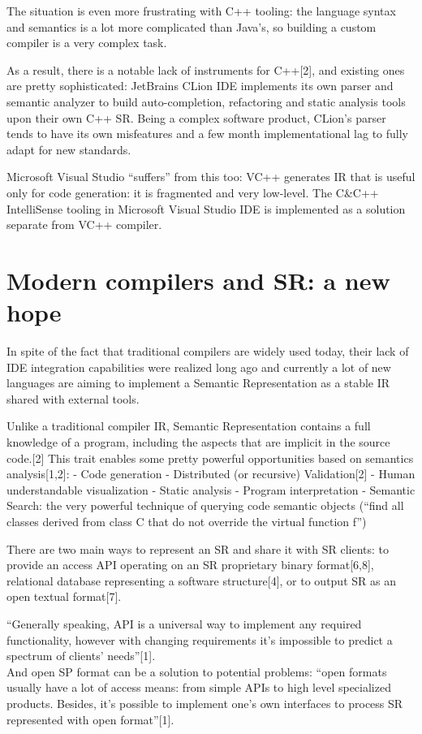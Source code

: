 The situation is even more frustrating with C++ tooling: the language syntax
and semantics is a lot more complicated than Java’s, so building a custom
compiler is a very complex task.

As a result, there is a notable lack of instruments for C++[2], and existing
ones are pretty sophisticated: JetBrains CLion IDE implements its own parser
and semantic analyzer to build auto-completion, refactoring and static analysis
tools upon their own C++ SR. Being a complex software product, CLion’s parser
tends to have its own misfeatures and a few month implementational lag to
fully adapt for new standards.


Microsoft Visual Studio “suffers” from this too: VC++ generates IR that is useful
only for code generation: it is fragmented and very low-level.
The C\&C++ IntelliSense tooling in Microsoft Visual Studio IDE is implemented
as a solution separate from VC++ compiler.

\newpage

\section{Modern compilers and SR: a new hope}
\label{sec:review_2}

In spite of the fact that traditional compilers are widely used today, their lack of
IDE integration capabilities were realized long ago and currently a lot of new
languages are aiming to implement a Semantic Representation as a stable IR
shared with external tools.

Unlike a traditional compiler IR, Semantic Representation contains a full
knowledge of a program, including the aspects that are implicit in the source
code.[2] This trait enables some pretty powerful opportunities based on
semantics analysis[1,2]:
- Code generation
- Distributed (or recursive) Validation[2]
- Human understandable visualization
- Static analysis
- Program interpretation
- Semantic Search: the very powerful technique of querying code semantic
objects (“find all classes derived from class C that do not override the virtual function
f”)

There are two main ways to represent an SR and share it with SR clients: to
provide an access API operating on an SR proprietary binary format[6,8],
relational database representing a software structure[4], or to output SR as an
open textual format[7].

“Generally speaking, API is a universal way to implement any required
functionality, however with changing requirements it’s impossible to predict a
spectrum of clients’ needs”[1].\\
And open SP format can be a solution to potential problems: “open formats
usually have a lot of access means: from simple APIs to high level specialized
products. Besides, it’s possible to implement one’s own interfaces to process SR
represented with open format”[1].

